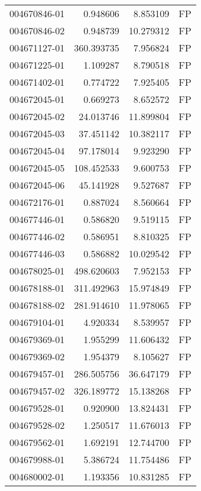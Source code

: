 \begin{tabular}{lrrl}
004670846-01 &    0.948606 &       8.853109 &   FP \\
004670846-02 &    0.948739 &      10.279312 &   FP \\
004671127-01 &  360.393735 &       7.956824 &   FP \\
004671225-01 &    1.109287 &       8.790518 &   FP \\
004671402-01 &    0.774722 &       7.925405 &   FP \\
004672045-01 &    0.669273 &       8.652572 &   FP \\
004672045-02 &   24.013746 &      11.899804 &   FP \\
004672045-03 &   37.451142 &      10.382117 &   FP \\
004672045-04 &   97.178014 &       9.923290 &   FP \\
004672045-05 &  108.452533 &       9.600753 &   FP \\
004672045-06 &   45.141928 &       9.527687 &   FP \\
004672176-01 &    0.887024 &       8.560664 &   FP \\
004677446-01 &    0.586820 &       9.519115 &   FP \\
004677446-02 &    0.586951 &       8.810325 &   FP \\
004677446-03 &    0.586882 &      10.029542 &   FP \\
004678025-01 &  498.620603 &       7.952153 &   FP \\
004678188-01 &  311.492963 &      15.974849 &   FP \\
004678188-02 &  281.914610 &      11.978065 &   FP \\
004679104-01 &    4.920334 &       8.539957 &   FP \\
004679369-01 &    1.955299 &      11.606432 &   FP \\
004679369-02 &    1.954379 &       8.105627 &   FP \\
004679457-01 &  286.505756 &      36.647179 &   FP \\
004679457-02 &  326.189772 &      15.138268 &   FP \\
004679528-01 &    0.920900 &      13.824431 &   FP \\
004679528-02 &    1.250517 &      11.676013 &   FP \\
004679562-01 &    1.692191 &      12.744700 &   FP \\
004679988-01 &    5.386724 &      11.754486 &   FP \\
004680002-01 &    1.193356 &      10.831285 &   FP \\

\end{tabular}
